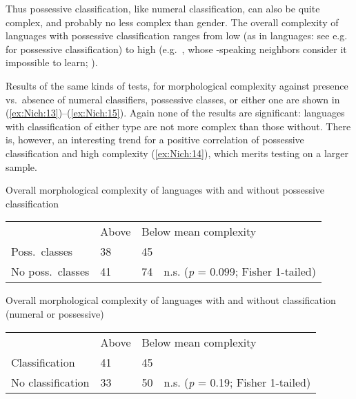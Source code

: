 \documentclass[output=collectionpaper]{langsci/langscibook}
\begin{document}
Thus possessive classification, like numeral classification, can also be quite complex, and probably no less complex than gender. The overall complexity of languages with possessive classification ranges from low (as in  languages: see e.g.\ \citealt{Wilson1982} for  possessive classification) to high (e.g.\ , whose -speaking neighbors consider it impossible to learn; \citealt[51]{Thurston1982}).

Results of the same kinds of tests, for morphological complexity against presence vs.\ absence of numeral classifiers, possessive classes, or either one are shown in (\ref{ex:Nich:13})--(\ref{ex:Nich:15}). Again none of the results are significant: languages with classification of either type are not more complex than those without. There is, however, an interesting trend for a positive correlation of possessive classification and high complexity (\ref{ex:Nich:14}), which merits testing on a larger sample.

%

\ea
\label{ex:Nich:14}
Overall morphological complexity of languages with and without possessive classification\\
\medskip
\begin{tabular}{p{2.7cm}p{1.3cm}p{1.3cm}l}
				 &Above 	 &	\multicolumn{2}{l}{Below mean complexity} \\
	Poss.\ classes	 &	38	 &	45 \\
	No poss.\ classes	 &41	 &	74	 &n.s. (\textit{p} = 0.099; Fisher 1-tailed)	  \\
\end{tabular}
\z

\ea
\label{ex:Nich:15}
Overall morphological complexity of languages with and without classification (numeral or possessive)\\
\medskip
\begin{tabular}{p{2.7cm}p{1.3cm}p{1.3cm}l}
				 &Above 	 &	\multicolumn{2}{l}{Below mean complexity} \\
	Classification		 &41	 &	45 \\
	No classification	 &33	 &	50 &	n.s.  (\textit{p} = 0.19; Fisher 1-tailed) \\
\end{tabular}
\z
\end{document}
